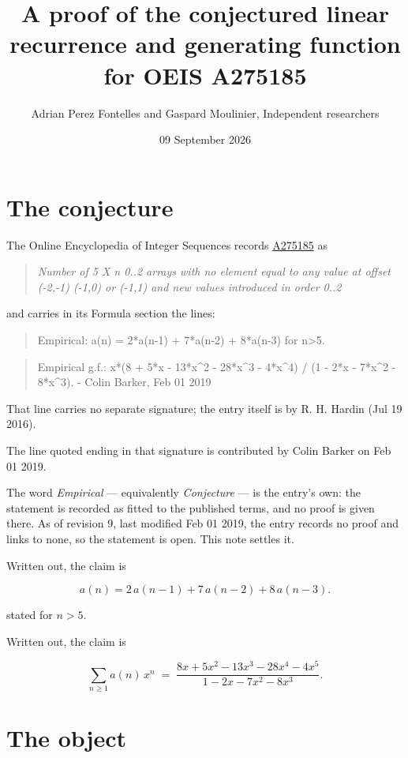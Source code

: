 \documentclass[11pt]{article}
\title{A proof of the conjectured linear recurrence and generating function for OEIS A275185}
\author{Adrian Perez Fontelles and Gaspard Moulinier, Independent researchers}
\date{09 September 2026}
\theoremstyle{definition}
\begin{document}
\maketitle
\section{The conjecture}

The Online Encyclopedia of Integer Sequences records \href{https://oeis.org/A275185}{A275185} as

\begin{quote}\itshape Number of 5 X n 0..2 arrays with no element equal to any value at offset (-2,-1) (-1,0) or (-1,1) and new values introduced in order 0..2\end{quote}

and carries in its Formula section the lines:

\begin{quote}\ttfamily Empirical: a(n) = 2*a(n-1) + 7*a(n-2) + 8*a(n-3) for n>5.\end{quote}

\begin{quote}\ttfamily Empirical g.f.: x*(8 + 5*x - 13*x\textasciicircum{}2 - 28*x\textasciicircum{}3 - 4*x\textasciicircum{}4) / (1 - 2*x - 7*x\textasciicircum{}2 - 8*x\textasciicircum{}3). - Colin Barker, Feb 01 2019\end{quote}

That line carries no separate signature; the entry itself is by R. H. Hardin (Jul 19 2016).

The line quoted ending in that signature is contributed by Colin Barker on Feb 01 2019.

The word {\itshape Empirical} --- equivalently {\itshape Conjecture} --- is the entry's own: the statement is recorded as fitted to the published terms, and no proof is given there. As of revision 9, last modified Feb 01 2019, the entry records no proof and links to none, so the statement is open. This note settles it.

Written out, the claim is

\[a(n) = 2\,a(n-1) + 7\,a(n-2) + 8\,a(n-3).\]

stated for $n > 5$.

Written out, the claim is

\[\sum_{n \ge 1} a(n)\,x^n \;=\; \frac{8x + 5x^{2} - 13x^{3} - 28x^{4} - 4x^{5}}{1 - 2x - 7x^{2} - 8x^{3}}.\]

\section{The object}
\end{document}
